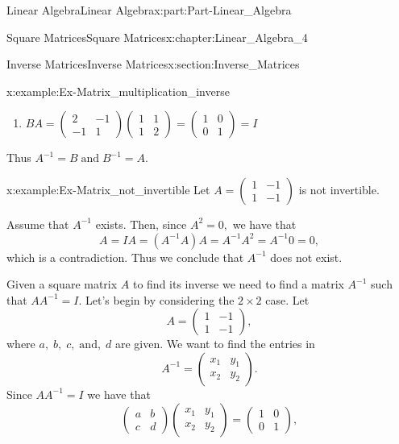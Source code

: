 \documentclass[oneside,10pt,]{book}
\numberwithin{equation}{section}
\newcommand{\amp}{&}
\begin{document}
\begin{partptx}{Linear Algebra}{}{Linear Algebra}{}{}{x:part:Part-Linear_Algebra}
\begin{chapterptx}{Square Matrices}{}{Square Matrices}{}{}{x:chapter:Linear_Algebra_4}
\begin{sectionptx}{Inverse Matrices}{}{Inverse Matrices}{}{}{x:section:Inverse_Matrices}
\begin{example}{}{x:example:Ex-Matrix_multiplication_inverse}
\begin{enumerate}[label=\alph*]
\item{}\(\displaystyle BA=\begin{pmatrix} 2 \amp -1 \\ -1 \amp 1 \end{pmatrix} \begin{pmatrix} 1 \amp 1 \\ 1 \amp 2 \end{pmatrix} = \begin{pmatrix} 1 \amp 0 \\ 0 \amp 1 \end{pmatrix}=I \)%
\end{enumerate}
 Thus \(A^{-1}=B\; \text{and}\; B^{-1}=A. \)\end{example}
\begin{example}{}{x:example:Ex-Matrix_not_invertible}%
Let \(A=\begin{pmatrix} 1 \amp -1 \\ 1 \amp -1 \end{pmatrix}  \) is not invertible.%
\par\smallskip%
\noindent\hypertarget{g:solution:id571602}{}Assume that \(A^{-1} \) exists. Then, since \(A^{2}=0, \) we have that%
\begin{equation*}
A=IA=(A^{-1}A)A=A^{-1}A^{2}=A^{-1}0=0, 
\end{equation*}
which is a contradiction. Thus we conclude that \(A^{-1} \) does not exist.\end{example}
Given a square matrix \(A \) to find its inverse we need to find a matrix \(A^{-1} \) such that \(AA^{-1}=I \).  Let’s begin by considering the \(2\times 2 \) case. Let%
\begin{equation*}
A=\begin{pmatrix} 1 \amp -1 \\ 1 \amp -1 \end{pmatrix},
\end{equation*}
where \(a, \; b,\; c,\; \text{and}, \; d \) are given. We want to find the entries in%
\begin{equation*}
A^{-1}=\begin{pmatrix} x_{1} \amp y_{1} \\ x_{2} \amp y_{2} \end{pmatrix}.
\end{equation*}
Since \(AA^{-1}=I \) we have that%
\begin{equation*}
\begin{pmatrix} a \amp b \\ c \amp d \end{pmatrix} \begin{pmatrix} x_{1} \amp y_{1} \\ x_{2} \amp y_{2} \end{pmatrix}=\begin{pmatrix} 1 \amp 0 \\ 0 \amp 1 \end{pmatrix},

\end{equation*}
\end{sectionptx}
\end{chapterptx}
\end{partptx}
\end{document}
